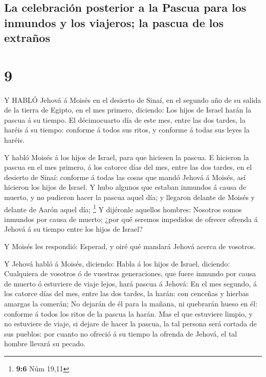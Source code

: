 \hypertarget{la-celebraciuxf3n-posterior-a-la-pascua-para-los-inmundos-y-los-viajeros-la-pascua-de-los-extrauxf1os}{%
\subsection{La celebración posterior a la Pascua para los inmundos y los
viajeros; la pascua de los
extraños}\label{la-celebraciuxf3n-posterior-a-la-pascua-para-los-inmundos-y-los-viajeros-la-pascua-de-los-extrauxf1os}}

\hypertarget{section-8}{%
\section{9}\label{section-8}}

 Y HABLÓ Jehová á Moisés en el desierto de Sinaí, en el
segundo año de su salida de la tierra de Egipto, en el mes primero,
diciendo:  Los hijos de Israel harán la pascua á su tiempo.
 El décimocuarto día de este mes, entre las dos tardes, la
haréis á su tiempo: conforme á todos sus ritos, y conforme á todas sus
leyes la haréis.

 Y habló Moisés á los hijos de Israel, para que hiciesen la
pascua.  E hicieron la pascua en el mes primero, á los
catorce días del mes, entre las dos tardes, en el desierto de Sinaí:
conforme á todas las cosas que mandó Jehová á Moisés, así hicieron los
hijos de Israel.  Y hubo algunos que estaban inmundos á
causa de muerto, y no pudieron hacer la pascua aquel día; y llegaron
delante de Moisés y delante de Aarón aquel día; \footnote{\textbf{9:6}
  Núm 19,11}  Y dijéronle aquellos hombres: Nosotros somos
inmundos por causa de muerto; ¿por qué seremos impedidos de ofrecer
ofrenda á Jehová á su tiempo entre los hijos de Israel?

 Y Moisés les respondió: Esperad, y oiré qué mandará Jehová
acerca de vosotros.

 Y Jehová habló á Moisés, diciendo:  Habla á
los hijos de Israel, diciendo: Cualquiera de vosotros ó de vuestras
generaciones, que fuere inmundo por causa de muerto ó estuviere de viaje
lejos, hará pascua á Jehová:  En el mes segundo, á los
catorce días del mes, entre las dos tardes, la harán: con cenceñas y
hierbas amargas la comerán;  No dejarán de él para la
mañana, ni quebrarán hueso en él: conforme á todos los ritos de la
pascua la harán.  Mas el que estuviere limpio, y no
estuviere de viaje, si dejare de hacer la pascua, la tal persona será
cortada de sus pueblos: por cuanto no ofreció á su tiempo la ofrenda de
Jehová, el tal hombre llevará su pecado.

